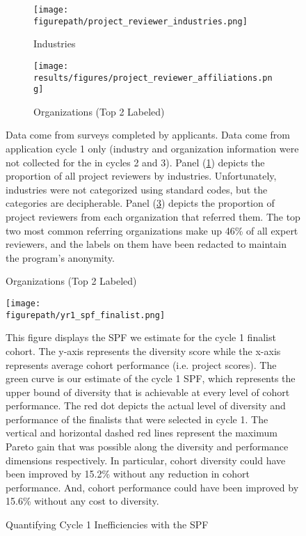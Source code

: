     
    \begin{figure}[!htb]
        \centering
        \caption{Distributions of Reviewer Industries and Organizations (Cycle 1)}
        \begin{subfigure}[t]{\textwidth}
            \centering
                    \caption{Industries} \label{subfig:rev_industries}
            \texttt{[image: \\figurepath/project\_reviewer\_industries.png]} 
        \end{subfigure}
        \hfill
        \vspace{1em}
        \begin{subfigure}[t]{\textwidth}
            \centering
                   \caption{Organizations (Top 2 Labeled)} \label{subfig:rev_orgs}
            \texttt{[image: results/figures/project\_reviewer\_affiliations.png]} 
        \end{subfigure}
        \begin{notes}
        Data come from surveys completed by applicants. Data come from application cycle 1 only (industry and organization information were not collected for the in cycles 2 and 3). Panel (\ref{subfig:rev_industries}) depicts the proportion of all project reviewers by industries. Unfortunately, industries were not categorized using standard codes, but the categories are decipherable. Panel (\ref{subfig:rev_orgs}) depicts the proportion of project reviewers from each organization that referred them. The top two most common referring organizations make up 46\% of all expert reviewers, and the labels on them have been redacted to maintain the program's anonymity. 
        \end{notes}
    \end{figure}
    
    \newpage
    \begin{figure}[!htb]
    \centering
        \caption{Quantifying Cycle 1 Inefficiencies with the SPF} \label{fig:spf_2021}
      \texttt{[image: \\figurepath/yr1\_spf\_finalist.png]} 
        \begin{notes}
        This figure displays the SPF we estimate for the cycle 1 finalist cohort. The y-axis represents the diversity score while the x-axis represents average cohort performance (i.e. project scores). The green curve is our estimate of the cycle 1 SPF, which represents the upper bound of diversity that is achievable at every level of cohort performance. The red dot depicts the actual level of diversity and performance of the finalists that were selected in cycle 1. The vertical and horizontal dashed red lines represent the maximum Pareto gain that was possible along the diversity and performance dimensions respectively. In particular, cohort diversity could have been improved by 15.2\% without any reduction in cohort performance. And, cohort performance could have been improved by 15.6\% without any cost to diversity. 
        \end{notes}
    \end{figure}
    
